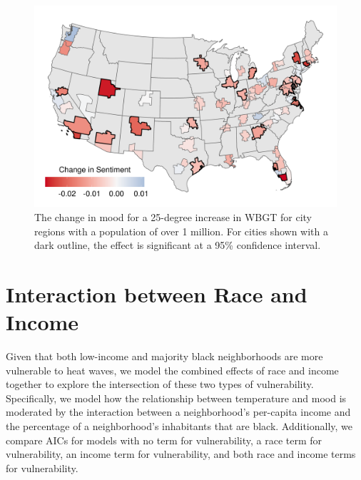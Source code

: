 \documentclass{article}
\begin{document}
\begin{figure}[H]
\centering
  \includegraphics[width=\linewidth]{../res/map_wbgt.png}
    \caption{The change in mood for a 25-degree increase in WBGT for city regions with a population of over 1 million.  For cities shown with a dark outline, the effect is significant at a 95\% confidence interval.}
  \label{fig:map}
\end{figure}

\newpage
\section*{Interaction between Race and Income}
Given that both low-income and majority black neighborhoods are more vulnerable to heat waves, we model the combined effects of race and income together to explore the intersection of these two types of vulnerability. Specifically, we model how the relationship between temperature and mood is moderated by the interaction between a neighborhood's per-capita income and the percentage of a neighborhood's inhabitants that are black. Additionally, we compare AICs for models with no term for vulnerability, a race term for vulnerability, an income term for vulnerability, and both race and income terms for vulnerability.
\end{document}
